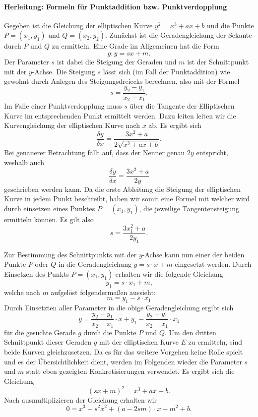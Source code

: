 \paragraph{Herleitung: Formeln für Punktaddition bzw. Punktverdopplung}
Gegeben ist die Gleichung der elliptischen Kurve $y^2 = x^3 +ax + b$ und die Punkte $P = (x_1, y_1)$ und $Q = (x_2, y_2)$. Zunächst ist die Geradengleichung der Sekante durch $P$ und $Q$ zu ermitteln. Eine Grade im Allgemeinen hat die Form $$g: y = sx + m.$$ Der Parameter $s$ ist dabei die Steigung der Geraden und $m$ ist der Schnittpunkt mit der $y$-Achse. Die Steigung $s$ lässt sich (im Fall der Punktaddition) wie gewohnt durch Anlegen des Steigungsdreiecks berechnen, also mit der Formel $$s = \frac{y_2 - y_1}{x_2  - x_1}.$$ Im Falle einer Punktverdopplung muss $s$ über die Tangente der Elliptischen Kurve im entsprechenden Punkt ermittelt werden. Dazu leiten leiten wir die Kurvengleichung der elliptischen Kurve nach $x$ ab. Es ergibt sich $$\frac{\delta y}{\delta x} = \frac{3x^2 + a}{2 \sqrt{x^3 + ax + b}}.$$ Bei genauerer Betrachtung fällt auf, dass der Nenner genau $2y$ entspricht, weshalb auch $$\frac{\delta y}{\delta x} = \frac{3x^2 + a}{2y}$$ geschrieben werden kann. Da die erste Ableitung die Steigung der elliptischen Kurve in jedem Punkt beschreibt, haben wir somit eine Formel mit welcher wird durch einsetzen eines Punktes $P = (x_1, y_1)$, die jeweilige Tangentensteigung ermitteln können. Es gilt also $$s = \frac{3x_1^2 + a}{2y_1}\text{.}$$

Zur Bestimmung des Schnittpunkts mit der $y$-Achse kann nun einer der beiden Punkte $P$ oder $Q$ in die Geradengleichung $y = s \cdot x + m$ eingesetzt werden. Durch Einsetzen des Punkts $P = (x_1, y_1)$  erhalten wir die folgende Gleichung $$y_1 = s \cdot x_1 + m\text{,}$$ welche nach $m$ aufgelöst folgendermaßen aussieht: $$m = y_1 - s \cdot x_1$$
Durch Einsetzten aller Parameter in die obige Geradengleichung ergibt sich $$y = \frac{y_2 - y_1}{x_2  - x_1} \cdot x + y_1 - \frac{y_2 - y_1}{x_2  - x_1} \cdot x_1$$ für die gesuchte Gerade $g$ durch die Punkte $P$ und $Q$. Um den dritten Schnittpunkt dieser Geraden $g$ mit der elliptischen Kurve $E$ zu ermitteln, sind beide Kurven gleichzusetzen. Da es für das weitere Vorgehen keine Rolle spielt und es der Übersichtlichkeit dient, werden im Folgenden wieder die Parameter $s$ und $m$ statt eben gezeigten Konkretisierungen verwendet. Es ergibt sich die Gleichung $$(sx+m)^2 = x^3 + ax + b\text{.}$$ Nach ausmultiplizieren der Gleichung erhalten wir $$0 =  x^3 - s^2x^2 + (a-2sm)\cdot x - m^2+b \text{.}$$

